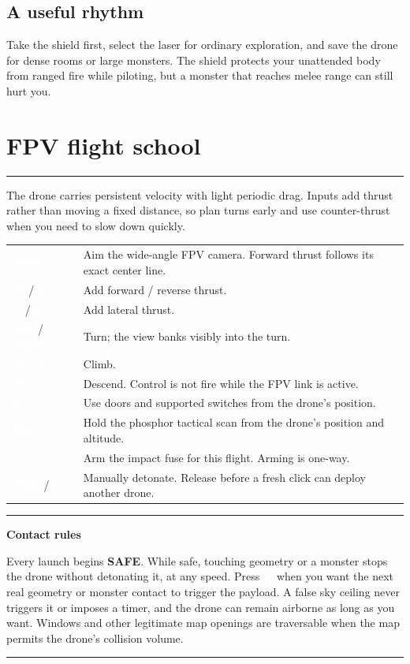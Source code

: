 \documentclass[10pt]{article}
\newcommand{\key}[1]{%
  \begingroup
  \setlength{\fboxsep}{2.5pt}%
  \colorbox{Ink}{\textcolor{white}{\sffamily\bfseries\footnotesize #1}}%
  \endgroup
}
\newenvironment{guidepanel}[2]{%
  \par\medskip
  \begingroup
  \def\GuidePanelAccent{#1}%
  \color{#1}\hrule height 1.4pt
  \vspace{5pt}%
  \color{Ink}%
  \noindent\begin{minipage}{\linewidth}
}{%
  \end{minipage}%
  \vspace{4pt}%
  \color{\GuidePanelAccent}\hrule height 0.5pt
  \endgroup
  \par\medskip
}
\newcommand{\sectionrule}[1]{%
  \vspace{2pt}
  {\color{#1}\rule{\linewidth}{1.5pt}}
}
\begin{document}
\subsection*{A useful rhythm}

Take the shield first, select the laser for ordinary exploration, and save the
drone for dense rooms or large monsters. The shield protects your unattended
body from ranged fire while piloting, but a monster that reaches melee range
can still hurt you.

\newpage
\section*{FPV flight school}
\sectionrule{DroneAmber}

The drone carries persistent velocity with light periodic drag. Inputs add
thrust rather than moving a fixed distance, so plan turns early and use
counter-thrust when you need to slow down quickly.

\begin{tabularx}{\linewidth}{K Y}
\key{Mouse} & Aim the wide-angle FPV camera. Forward thrust follows its exact center line. \\
\key{W} / \key{S} & Add forward / reverse thrust. \\
\key{A} / \key{D} & Add lateral thrust. \\
\key{Left} / \key{Right} & Turn; the view banks visibly into the turn. \\
\key{Space} & Climb. \\
\key{Ctrl} & Descend. Control is not fire while the FPV link is active. \\
\key{E} & Use doors and supported switches from the drone's position. \\
\key{Tab} & Hold the phosphor tactical scan from the drone's position and altitude. \\
\key{X} & Arm the impact fuse for this flight. Arming is one-way. \\
\key{Click} / \key{F} & Manually detonate. Release before a fresh click can deploy another drone. \\
\end{tabularx}

\begin{guidepanel}{DroneAmber}{PaleAmber}
\textbf{Contact rules}\par
Every launch begins \textbf{SAFE}. While safe, touching geometry or a monster
stops the drone without detonating it, at any speed. Press \key{X} when you want
the next real geometry or monster contact to trigger the payload. A false sky
ceiling never triggers it or imposes a timer, and the drone can remain airborne
as long as you want. Windows and other legitimate map openings are traversable
when the map permits the drone's collision volume.
\end{guidepanel}
\end{document}
